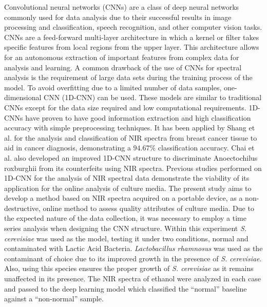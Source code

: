 \documentclass[12pt]{report}
\renewcommand{\cite}{\supercite}
\begin{document}
Convolutional neural networks (CNNs) are a class of deep neural networks commonly used for data analysis due to their successful results in image processing and classification,\cite{AnalysisConvolutionalNeuralsharma2018} speech recognition,\cite{SpeechRecognitionUsingalsobhani2021} and other computer vision tasks. CNNs are a feed-forward multi-layer architecture in which a kernel or filter takes specific features from local regions from the upper layer.  This architecture allows for an autonomous extraction of important features from complex data for analysis and learning.\cite{NIRSpectroscopyCombinedshang2023} A common drawback of the use of CNNs for spectral analysis is the requirement of large data sets during the training process of the model.\cite{zhangNearInfraredSpectralCharacteristic2022} To avoid overfitting due to a limited number of data samples, one-dimensional CNN (1D-CNN) can be used. These models are similar to traditional CNNs except for the data size required and low computational requirements. 1D-CNNs have proven to have good information extraction and high classification accuracy with simple preprocessing techniques. It has been applied by Shang et al.\cite{NIRSpectroscopyCombinedshang2023} for the analysis and classification of NIR spectra from breast cancer tissue to aid in cancer diagnosis, demonstrating a $94.67\%$ classification accuracy. Chai et al.\cite{Improved1DConvolutionalchai2021} also developed an improved 1D-CNN structure to discriminate Anoectochilus roxburghii from its counterfeits using NIR spectra.
Previous studies performed on 1D-CNN for the analysis of NIR spectral data demonstrate the viability of its application for the online analysis of culture media. The present study aims to develop a method based on NIR spectra acquired on a portable device, as a non-destructive, online method to assess quality attributes of culture media. Due to the expected nature of the data collection, it was necessary to employ a time series analysis when designing the CNN structure. Within this experiment \emph{S. cerevisiae} was used as the model, testing it under two conditions, normal and contaminated with Lactic Acid Bacteria. \emph{Lactobacillus rhamnosus} was used as the contaminant of choice due to its improved growth in the presence of \emph{S. cerevisiae}. Also, using this species ensures the proper growth of \emph{S. cerevisiae} as it remains unaffected in its presence.\cite{YeastHumanCoevolutionnenciarini2024} The NIR spectra of ethanol were analyzed in each case and passed to the deep learning model which classified the “normal” baseline against a “non-normal” sample. 
\end{document}
